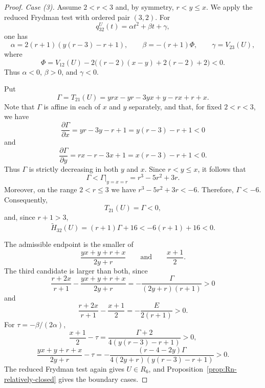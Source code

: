 \documentclass[10pt,a4paper]{amsart}
\begin{document}
\begin{proof}
\smallskip
\noindent
\emph{Case (3).}
Assume $2<r<3$ and, by symmetry, $r<y\leq x$. We apply the reduced
Frydman test with ordered pair $(3,2)$. For
\[
q_{32}^U(t)=\alpha t^2+\beta t+\gamma,
\]
one has
\[
\alpha=2(r+1)(y(r-3)-r+1),
\qquad
\beta=-(r+1)\Phi,
\qquad
\gamma=V_{23}(U),
\]
where
\[
\Phi=V_{12}(U)-2\bigl((r-2)(x-y)+2(r-2)+2\bigr)<0.
\]
Thus $\alpha<0$, $\beta>0$, and $\gamma<0$.


Put
\[
\Gamma=T_{21}(U)
=yrx-yr-3yx+y-rx+r+x.
\]
Note that $\Gamma$ is affine in each of $x$ and $y$ separately, and that, for fixed \(2<r<3\), we have
\[
\frac{\partial \Gamma}{\partial x}
=yr-3y-r+1
=y(r-3)-r+1<0
\]
and
\[
\frac{\partial \Gamma}{\partial y}
=rx-r-3x+1
=x(r-3)-r+1<0.
\]
Thus \(\Gamma\) is strictly decreasing in
both \(y\) and \(x\). Since \(r<y\leq x\), it follows that
\[
\Gamma<\Gamma|_{y=x=r}
=r^3-5r^2+3r.
\]
Moreover, on the range $2< r \leq 3$ we have $r^3-5r^2+3r<-6$.
Therefore,
$\Gamma<-6$. Consequently, 
\[
T_{21}(U)=\Gamma<0,
\]
and, since \(r+1>3\),
\[
\widetilde H_{32}(U)
=(r+1)\Gamma+16
<-6(r+1)+16<0.
\]

The admissible endpoint is the smaller of
\[
\frac{yx+y+r+x}{2y+r}
\qquad\text{and}\qquad
\frac{x+1}{2}.
\]
The third candidate is larger
than both, since
\[
\frac{r+2x}{r+1}-\frac{yx+y+r+x}{2y+r}
=-\frac{\Gamma}{(2y+r)(r+1)}>0
\]
and
\[
\frac{r+2x}{r+1}-\frac{x+1}{2}
=-\frac{E}{2(r+1)}>0.
\]
For
$\tau=-\beta/(2\alpha)$,
\[
\frac{x+1}{2}-\tau
=\frac{\Gamma+2}{4(y(r-3)-r+1)}>0,
\]
\[
\frac{yx+y+r+x}{2y+r}-\tau
=-\frac{(r-4-2y)\Gamma}
{4(2y+r)(y(r-3)-r+1)}>0.
\]
The reduced Frydman test again gives $U\in R_6$, and
Proposition~\ref{prop:Rn-relatively-closed} gives the boundary cases.
\end{proof}
\end{document}
